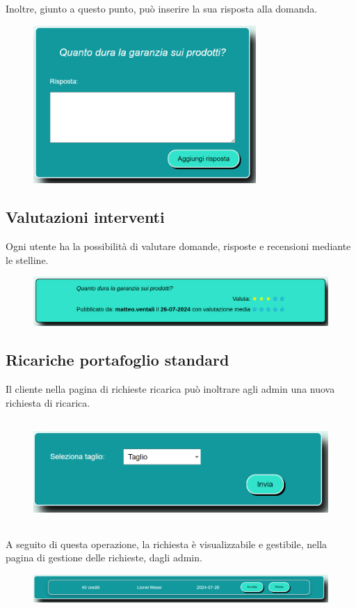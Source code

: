 \documentclass[a4paper, 14pt]{article}
\begin{document}
\begin{flushleft}
\begin{figure}[H]
				\end{figure}
				Inoltre, giunto a questo punto, può inserire la sua risposta alla domanda.
				\begin{figure}[H]
					\centering
					\includegraphics[height=6cm, frame=2pt]{"screenInserimentoRisposta.png"}	
				\end{figure}
			\subsection{Valutazioni interventi}
				Ogni utente ha la possibilità di valutare domande, risposte e recensioni mediante le stelline.
				\begin{figure}[H]
					\centering
					\includegraphics[width=\textwidth, frame=2pt]{"screenValutazione.png"}	
				\end{figure}
			\subsection{Ricariche portafoglio standard}
				Il cliente nella pagina di richieste ricarica può inoltrare agli admin una nuova richiesta di ricarica.
				\begin{figure}[H]
					\centering
					\includegraphics[height=4cm, frame=2pt]{"screenRichiestaRicarica.png"}	
				\end{figure}
				A seguito di questa operazione, la richiesta è visualizzabile e gestibile, nella pagina di gestione delle richieste, dagli admin.
				\begin{figure}[H]
					\centering
					\includegraphics[width=\textwidth, frame=2pt]{"screenGestioneRicariche.png"}	
				\end{figure}

\end{flushleft}
\end{document}
